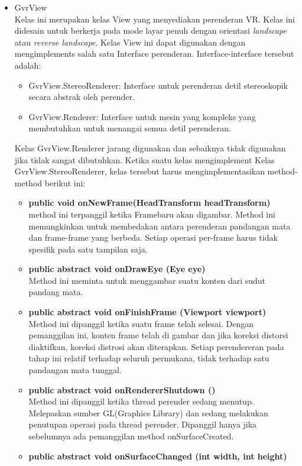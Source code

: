 \documentclass[a4paper,twoside]{article}
\begin{document}
\begin{enumerate}
\begin{itemize}
	\item GvrView\\
	Kelas ini merupakan kelas View yang menyediakan perenderan VR. Kelas ini didesain untuk berkerja pada mode layar penuh dengan orientasi \textit{landscape} atau \textit{reverse landscape}. Kelas View ini dapat digunakan dengan mengimplements salah satu Interface perenderan. Interface-interface tersebut adalah:
	\begin{itemize}
		\item GvrView.StereoRenderer: Interface untuk perenderan detil stereoskopik secara abstrak oleh perender.
		\item GvrView.Renderer: Interface untuk mesin yang kompleks yang membutuhkan untuk menangai semua detil perenderan.
	\end{itemize}
Kelas GvrView.Renderer jarang digunakan dan sebaiknya tidak digunakan jika tidak sangat dibutuhkan.
Ketika suatu kelas mengimplement Kelas GvrView.StereoRenderer, kelas tersebut harus mengimplementasikan method-method berikut ini:
\begin{itemize}
	\item \textbf{public void onNewFrame(HeadTransform headTransform)}\\
	method ini terpanggil ketika Framebaru akan digambar. Method ini memungkinkan untuk membedakan antara perenderan pandangan mata dan frame-frame yang berbeda. Setiap operasi per-frame harus tidak spesifik pada satu tampilan saja.
	\item \textbf{public abstract void onDrawEye (Eye eye)}\\
	Method ini meminta untuk menggambar suatu konten dari sudut pandang mata.
	\item \textbf{public abstract void onFinishFrame (Viewport viewport)}\\
	Method ini dipanggil ketika suatu frame telah selesai. Dengan pemanggilan ini, konten frame telah di gambar dan jika koreksi distorsi diaktifkan, koreksi distrosi akan diterapkan. Setiap perendereran pada tahap ini relatif terhadap seluruh permukana, tidak terhadap satu pandangan mata tunggal. 
	\item \textbf{public abstract void onRendererShutdown ()}\\
	Method ini dipanggil ketika thread perender sedang menutup. Melepaskan sumber GL(Graphics Library) dan sedang melakukan penutupan operasi pada thread perender. Dipanggil hanya jika sebelumnya ada pemanggilan method onSurfaceCreated.
	\item \textbf{public abstract void onSurfaceChanged (int width, int height)}\\

\end{itemize}
\end{itemize}
\end{enumerate}
\end{document}

